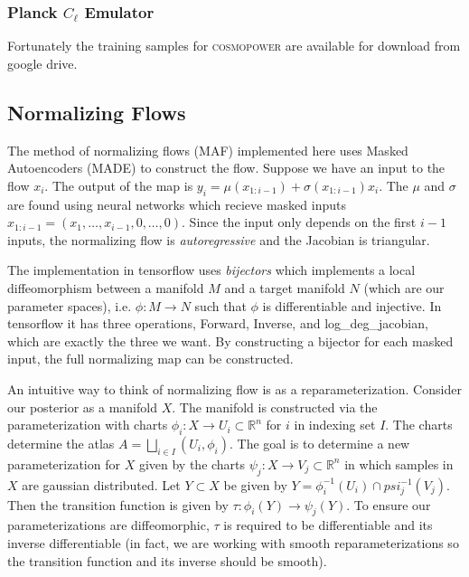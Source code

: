 \subsubsection{Planck $C_\ell$ Emulator}

Fortunately the training samples for \textsc{cosmopower} are available for download from google drive.

\subsection{Normalizing Flows}

The method of normalizing flows (MAF) implemented here uses Masked Autoencoders (MADE) to construct the flow. 
Suppose we have an input to the flow $x_i$. 
The output of the map is $y_i= \mu(x_{1:i-1})+\sigma(x_{1:i-1})x_i$. 
The $\mu$ and $\sigma$ are found using neural networks which recieve masked inputs $x_{1:i-1}=(x_1,\ldots,x_{i-1},0,\ldots,0)$. 
Since the input only depends on the first $i-1$ inputs, the normalizing flow is \textit{autoregressive} and the Jacobian is triangular.

The implementation in tensorflow uses \textit{bijectors} which implements a local diffeomorphism between a manifold $M$ and a target manifold $N$ (which are our parameter spaces), i.e. $\phi:M\rightarrow N$ such that $\phi$ is differentiable and injective. 
In tensorflow it has three operations, Forward, Inverse, and log\_deg\_jacobian, which are exactly the three we want. 
By constructing a bijector for each masked input, the full normalizing map can be constructed.

An intuitive way to think of normalizing flow is as a reparameterization. Consider our posterior as a manifold $X$. The manifold is constructed via the parameterization with charts $\phi_i:X\rightarrow U_i \subset \mathbb{R}^n$ for $i$ in indexing set $I$. 
The charts determine the atlas $A = \bigsqcup\limits_{i\in I} (U_i,\phi_i)$. 
The goal is to determine a new parameterization for $X$ given by the charts $\psi_j:X\rightarrow V_j \subset \mathbb{R}^n$ in which samples in $X$ are gaussian distributed. 
Let $Y \subset X$ be given by $Y = \phi_i^{-1}(U_i) \cap psi_j^{-1}(V_j)$. 
Then the transition function is given by $\tau:\phi_i(Y)\rightarrow\psi_j(Y)$. 
To ensure our parameterizations are diffeomorphic, $\tau$ is required to be differentiable and its inverse differentiable 
(in fact, we are working with smooth reparameterizations so the transition function and its inverse should be smooth).

